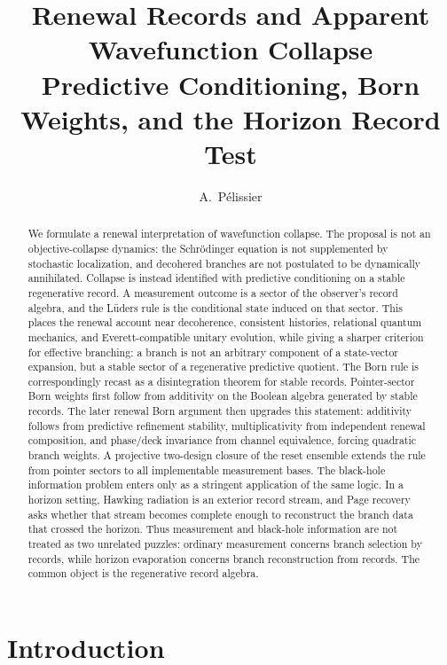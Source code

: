 \documentclass[11pt]{article}
\title{\textbf{Renewal Records and Apparent Wavefunction Collapse}\\[2mm]
\large Predictive Conditioning, Born Weights, and the Horizon Record Test}
\author{A.~P\'elissier}
\date{}
\numberwithin{equation}{section}
\theoremstyle{definition}
\theoremstyle{remark}
\begin{document}
\maketitle

\begin{abstract}
We formulate a renewal interpretation of wavefunction collapse.  The proposal is not an objective-collapse dynamics: the Schr\"odinger equation is not supplemented by stochastic localization, and decohered branches are not postulated to be dynamically annihilated.  Collapse is instead identified with predictive conditioning on a stable regenerative record.  A measurement outcome is a sector of the observer's record algebra, and the L\"uders rule is the conditional state induced on that sector.  This places the renewal account near decoherence, consistent histories, relational quantum mechanics, and Everett-compatible unitary evolution, while giving a sharper criterion for effective branching: a branch is not an arbitrary component of a state-vector expansion, but a stable sector of a regenerative predictive quotient.  The Born rule is correspondingly recast as a disintegration theorem for stable records.  Pointer-sector Born weights first follow from additivity on the Boolean algebra generated by stable records.  The later renewal Born argument then upgrades this statement: additivity follows from predictive refinement stability, multiplicativity from independent renewal composition, and phase/deck invariance from channel equivalence, forcing quadratic branch weights.  A projective two-design closure of the reset ensemble extends the rule from pointer sectors to all implementable measurement bases.  The black-hole information problem enters only as a stringent application of the same logic.  In a horizon setting, Hawking radiation is an exterior record stream, and Page recovery asks whether that stream becomes complete enough to reconstruct the branch data that crossed the horizon.  Thus measurement and black-hole information are not treated as two unrelated puzzles: ordinary measurement concerns branch selection by records, while horizon evaporation concerns branch reconstruction from records.  The common object is the regenerative record algebra.
\end{abstract}

{\setlength{\parskip}{0pt}\tableofcontents}

\section{Introduction}
\label{sec:intro}
\end{document}
